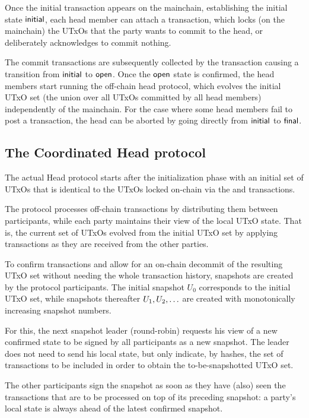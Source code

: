 

Once the initial transaction appears on the mainchain, establishing the initial
state $\mathsf{initial}$, each head member can attach a \mtxCom{} transaction, which
locks (on the mainchain) the UTxOs that the party wants to commit to the head,
or deliberately acknowledges to commit nothing.

The commit transactions are subsequently collected by the \mtxCCom{} transaction
causing a transition from $\mathsf{initial}$ to $\mathsf{open}$. Once the $\mathsf{open}$ state is
confirmed, the head members start running the off-chain head protocol, which
evolves the initial UTxO set (the union over all UTxOs committed by all head
members) independently of the mainchain. For the case where some head members
fail to post a \mtxCom{} transaction, the head can be aborted by going directly
from $\mathsf{initial}$ to $\mathsf{final}$.
\subsection{The Coordinated Head protocol}

The actual Head protocol starts after the initialization phase with an initial
set of UTxOs that is identical to the UTxOs locked on-chain via the \mtxCom{}
and \mtxCCom{} transactions.

The protocol processes off-chain transactions by distributing them between participants,
while each party maintains their view of the local UTxO state. That is, the current
set of UTxOs evolved from the initial UTxO set by applying transactions as they
are received from the other parties.

To confirm transactions and allow for an on-chain decommit of the resulting UTxO
set without needing the whole transaction history, snapshots are created by the
protocol participants. The initial snapshot $U_{0}$ corresponds to the initial
UTxO set, while snapshots thereafter $U_1,U_2,\ldots$  are created with
monotonically increasing snapshot numbers.

For this, the next snapshot leader (round-robin)   requests his view of a new confirmed state to be
signed by all participants as a new snapshot. The leader does not need to send his local state,
but only indicate, by hashes, the set of transactions to be included in order to
obtain the to-be-snapshotted UTxO set.

The other participants sign the snapshot as soon as they have (also) seen the
transactions that are to be processed on top of its preceding snapshot: a
party's local state is always ahead of the latest confirmed snapshot.

